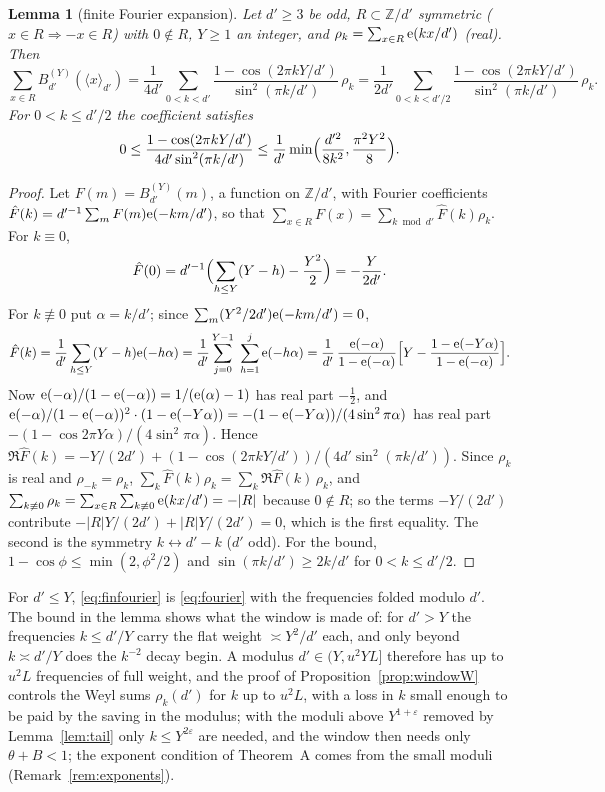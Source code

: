 \documentclass[11pt,a4paper]{article}
\newtheorem{lemma}[theorem]{Lemma}
\theoremstyle{remark}\newtheorem{remark}[theorem]{Remark}
\newcommand{\Z}{\mathbb{Z}}\newcommand{\Q}{\mathbb{Q}}\newcommand{\F}{\mathbb{F}}\newcommand{\R}{\mathbb{R}}
\newcommand{\rep}[2]{\langle #1\rangle_{#2}}
\begin{document}
\begin{lemma}[finite Fourier expansion]\label{lem:finfourier}
Let $d'\ge3$ be odd, $R\subset\Z/d'$ symmetric ($x\in R\Rightarrow-x\in R$) with $0\notin R$, $Y\ge1$ an integer, and
$\rho_k=\sum_{x\in R}\mathrm{e}(kx/d')$ (real). Then
\begin{equation}\label{eq:finfourier}
\sum_{x\in R}B^{(Y)}_{d'}(\rep x{d'})=\frac1{4d'}\sum_{0<k<d'}\frac{1-\cos(2\pi kY/d')}{\sin^2(\pi k/d')}\,\rho_k
=\frac1{2d'}\sum_{0<k<d'/2}\frac{1-\cos(2\pi kY/d')}{\sin^2(\pi k/d')}\,\rho_k .
\end{equation}
For $0<k\le d'/2$ the coefficient satisfies
\[
0\le\frac{1-\cos(2\pi kY/d')}{4d'\sin^2(\pi k/d')}\le\frac1{d'}\min\Bigl(\frac{d'^2}{8k^2},\frac{\pi^2Y^2}{8}\Bigr).
\]
\end{lemma}
\begin{proof}
Let $F(m)=B^{(Y)}_{d'}(m)$, a function on $\Z/d'$, with Fourier coefficients
$\hat F(k)=d'^{-1}\sum_{m}F(m)\mathrm{e}(-km/d')$, so that $\sum_{x\in R}F(x)=\sum_{k\bmod d'}\hat F(k)\rho_k$. For $k\equiv0$,
\[
\hat F(0)=d'^{-1}\Bigl(\sum_{h\le Y}(Y-h)-\frac{Y^2}2\Bigr)=-\frac Y{2d'}.
\]
For $k\not\equiv0$ put $\alpha=k/d'$; since $\sum_m(Y^2/2d')\mathrm{e}(-km/d')=0$,
\[
\hat F(k)=\frac1{d'}\sum_{h\le Y}(Y-h)\e(-h\alpha)=\frac1{d'}\sum_{j=0}^{Y-1}\ \sum_{h=1}^{j}\e(-h\alpha)
=\frac1{d'}\,\frac{\e(-\alpha)}{1-\e(-\alpha)}\Bigl[Y-\frac{1-\e(-Y\alpha)}{1-\e(-\alpha)}\Bigr].
\]
Now $\mathrm{e}(-\alpha)/(1-\mathrm{e}(-\alpha))=1/(\mathrm{e}(\alpha)-1)$ has real part $-\tfrac12$, and
$\mathrm{e}(-\alpha)/(1-\mathrm{e}(-\alpha))^2\cdot(1-\mathrm{e}(-Y\alpha))=-(1-\mathrm{e}(-Y\alpha))/(4\sin^2\pi\alpha)$ has real part
$-(1-\cos2\pi Y\alpha)/(4\sin^2\pi\alpha)$. Hence $\Re\hat F(k)=-Y/(2d')+(1-\cos(2\pi kY/d'))/(4d'\sin^2(\pi k/d'))$.
Since $\rho_k$ is real and $\rho_{-k}=\rho_k$, $\sum_k\hat F(k)\rho_k=\sum_k\Re\hat F(k)\,\rho_k$, and
$\sum_{k\not\equiv0}\rho_k=\sum_{x\in R}\sum_{k\not\equiv0}\mathrm{e}(kx/d')=-|R|$ because $0\notin R$; so the terms $-Y/(2d')$
contribute $-|R|Y/(2d')+|R|Y/(2d')=0$, which is the first equality. The second is the symmetry $k\leftrightarrow d'-k$
($d'$ odd). For the bound, $1-\cos\phi\le\min(2,\phi^2/2)$ and $\sin(\pi k/d')\ge2k/d'$ for $0<k\le d'/2$.
\end{proof}

For $d'\le Y$, \eqref{eq:finfourier} is \eqref{eq:fourier} with the frequencies folded modulo $d'$. The
bound in the lemma shows what the window is made of: for $d'>Y$ the frequencies $k\le d'/Y$ carry the flat weight
$\asymp Y^2/d'$ each, and only beyond $k\asymp d'/Y$ does the $k^{-2}$ decay begin. A modulus $d'\in(Y,u^2YL]$
therefore has up to $u^2L$ frequencies of full weight, and the proof of Proposition~\ref{prop:windowW} controls the Weyl sums
$\rho_k(d')$ for $k$ up to $u^2L$, with a loss in $k$ small enough to be paid by the saving in the modulus; with the moduli
above $Y^{1+\varepsilon}$ removed by Lemma~\ref{lem:tail} only $k\le Y^{2\varepsilon}$ are needed, and the window then needs only $\theta+B<1$; the
exponent condition of Theorem~A comes from the small moduli (Remark~\ref{rem:exponents}).
\end{document}
